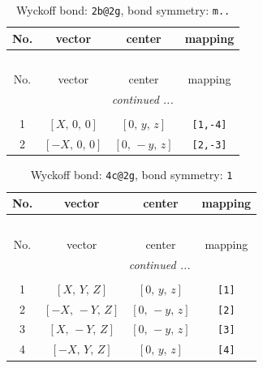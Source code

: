 \documentclass[fleqn,8pt]{jsarticle}
\begin{document}
\renewcommand{\arraystretch}{1.2}
\begin{longtable}{cccc}
\caption{Wyckoff bond: {\tt 2b@2g}, bond symmetry: {\tt m..}}
 \\
 \hline \hline
No. & vector & center & mapping \\ \hline \endfirsthead

\multicolumn{3}{l}{\tablename\ \thetable{}} \\
 \hline \hline
No. & vector & center & mapping \\ \hline \endhead

 \hline \hline
\multicolumn{3}{r}{\footnotesize\it continued ...} \\ \endfoot

 \hline \hline
\multicolumn{3}{r}{} \\ \endlastfoot

1 & $\left[ X,\, 0,\, 0 \right]$ & $\left[ 0,\, y,\, z \right]$ & {\tt [1,-4]} \\ \hline
2 & $\left[ - X,\, 0,\, 0 \right]$ & $\left[ 0,\, - y,\, z \right]$ & {\tt [2,-3]} \\
\end{longtable}
\renewcommand{\arraystretch}{1.2}
\begin{longtable}{cccc}
\caption{Wyckoff bond: {\tt 4c@2g}, bond symmetry: {\tt 1}}
 \\
 \hline \hline
No. & vector & center & mapping \\ \hline \endfirsthead

\multicolumn{3}{l}{\tablename\ \thetable{}} \\
 \hline \hline
No. & vector & center & mapping \\ \hline \endhead

 \hline \hline
\multicolumn{3}{r}{\footnotesize\it continued ...} \\ \endfoot

 \hline \hline
\multicolumn{3}{r}{} \\ \endlastfoot

1 & $\left[ X,\, Y,\, Z \right]$ & $\left[ 0,\, y,\, z \right]$ & {\tt [1]} \\ \hline
2 & $\left[ - X,\, - Y,\, Z \right]$ & $\left[ 0,\, - y,\, z \right]$ & {\tt [2]} \\ \hline
3 & $\left[ X,\, - Y,\, Z \right]$ & $\left[ 0,\, - y,\, z \right]$ & {\tt [3]} \\ \hline
4 & $\left[ - X,\, Y,\, Z \right]$ & $\left[ 0,\, y,\, z \right]$ & {\tt [4]} \\
\end{longtable}
\end{document}
